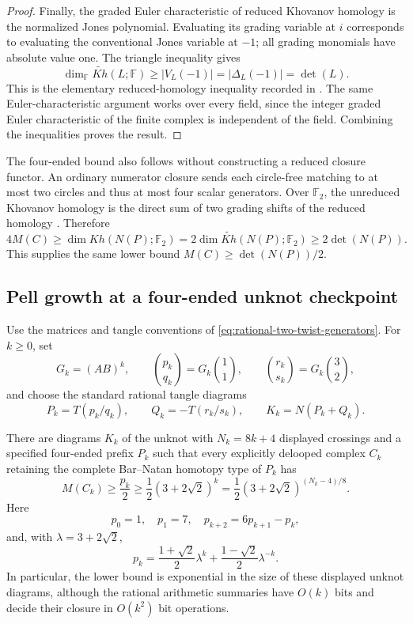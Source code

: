 \begin{proof}
Finally, the graded Euler characteristic of reduced Khovanov homology
is the normalized Jones polynomial.  Evaluating its grading variable
at $i$ corresponds to evaluating the conventional Jones variable at
$-1$; all grading monomials have absolute value one.  The triangle
inequality gives
\[
 \dim_{\mathbb F}\widetilde{Kh}(L;\mathbb F)
 \ge |V_L(-1)|=|\Delta_L(-1)|=\det(L).
\]
This is the elementary reduced-homology inequality recorded in
\cite[Section~3]{KhovanovPatterns}.  The same Euler-characteristic
argument works over every field, since the integer graded Euler
characteristic of the finite complex is independent of the field.
Combining the inequalities proves the result.
\end{proof}

\begin{remark}
The four-ended bound also follows without constructing a reduced
closure functor.  An ordinary numerator closure sends each
circle-free matching to at most two circles and thus at most four
scalar generators.  Over $\mathbb F_2$, the unreduced Khovanov
homology is the direct sum of two grading shifts of the reduced
homology \cite[Corollary~3.2.C]{ShumakovitchTorsion}.  Therefore
\[
 4M(C)\ge\dim Kh(N(P);\mathbb F_2)
 =2\dim\widetilde{Kh}(N(P);\mathbb F_2)
 \ge2\det(N(P)).
\]
This supplies the same lower bound $M(C)\ge\det(N(P))/2$.
\end{remark}

\subsection{Pell growth at a four-ended unknot checkpoint}

Use the matrices and tangle conventions of
\eqref{eq:rational-two-twist-generators}.  For $k\ge0$, set
\[
 G_k=(AB)^k,
 \qquad \binom{p_k}{q_k}=G_k\binom11,
 \qquad \binom{r_k}{s_k}=G_k\binom32,
\]
and choose the standard rational tangle diagrams
\[
 P_k=T(p_k/q_k),\qquad Q_k=-T(r_k/s_k),
 \qquad K_k=N(P_k+Q_k).
\]

\begin{theorem}
\label{thm:unknot-exponential-checkpoint}
There are diagrams $K_k$ of the unknot with $N_k=8k+4$ displayed
crossings and a specified four-ended prefix $P_k$ such that every
explicitly delooped complex $C_k$ retaining the complete Bar--Natan
homotopy type of $P_k$ has
\[
 M(C_k)\ge\frac{p_k}{2}
 \ge\frac12(3+2\sqrt2)^k
 =\frac12(3+2\sqrt2)^{(N_k-4)/8}.
\]
Here
\[
 p_0=1,\quad p_1=7,\quad
 p_{k+2}=6p_{k+1}-p_k,
\]
and, with $\lambda=3+2\sqrt2$,
\[
 p_k=\frac{1+\sqrt2}{2}\lambda^k
       +\frac{1-\sqrt2}{2}\lambda^{-k}.
\]
In particular, the lower bound is exponential in the size of these
displayed unknot diagrams, although the rational arithmetic summaries
have $O(k)$ bits and decide their closure in $O(k^2)$ bit operations.
\end{theorem}


